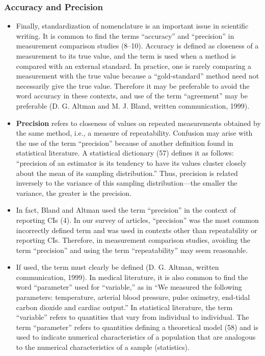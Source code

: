 \documentclass[]{article}
\begin{document}
\subsubsection*{Accuracy and Precision}
\begin{itemize}
\item Finally, standardization of nomenclature is an important issue in scientific writing. It is common to find the terms “accuracy” and “precision” in measurement comparison studies (8–10). Accuracy is defined as closeness of a measurement to its true value, and the term is used when a method is compared with an external standard. In practice, one is rarely comparing a measurement with the true value because a “gold-standard” method need not necessarily give the true value. Therefore it may be preferable to avoid the word accuracy in these contexts, and use of the term “agreement” may be preferable (D. G. Altman and M. J. Bland, written communication, 1999). 

\item \textbf{Precision} refers to closeness of values on repeated measurements obtained by the same method, i.e., a measure of repeatability. Confusion may arise with the use of the term “precision” because of another definition found in statistical literature. A statistical dictionary (57) defines it as follows: “precision of an estimator is its tendency to have its values cluster closely about the mean of its sampling distribution.” Thus, precision is related inversely to the variance of this sampling distribution—the smaller the variance, the greater is the precision. 

\item In fact, Bland and Altman used the term “precision” in the context of reporting CIs (4). In our survey of articles, “precision” was the most common incorrectly defined term and was used in contexts other than repeatability or reporting CIs. Therefore, in measurement comparison studies, avoiding the term “precision” and using the term “repeatability” may seem reasonable. 

\item If used, the term must clearly be defined (D. G. Altman, written communication, 1999). In medical literature, it is also common to find the word “parameter” used for “variable,” as in “We measured the following parameters: temperature, arterial blood pressure, pulse oximetry, end-tidal carbon dioxide and cardiac output.” In statistical literature, the term “variable” refers to quantities that vary from individual to individual. The term “parameter” refers to quantities defining a theoretical model (58) and is used to indicate numerical characteristics of a population that are analogous to the numerical characteristics of a sample (statistics). 



\end{itemize}
\end{document}
